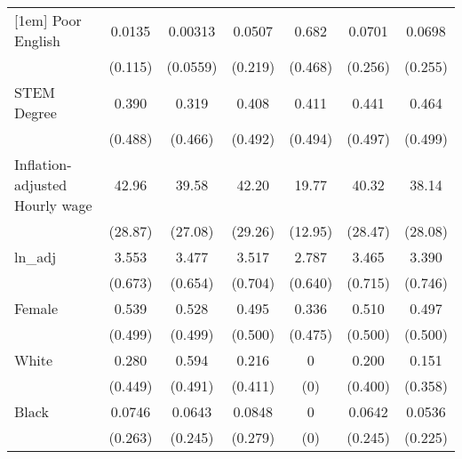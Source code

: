 \begin{table}[htbp]
\begin{tabular}{l*{6}{c}}
[1em]
Poor English        &      0.0135         &     0.00313         &      0.0507         &       0.682         &      0.0701         &      0.0698         \\
                    &     (0.115)         &    (0.0559)         &     (0.219)         &     (0.468)         &     (0.256)         &     (0.255)         \\
[1em]
STEM Degree         &       0.390         &       0.319         &       0.408         &       0.411         &       0.441         &       0.464         \\
                    &     (0.488)         &     (0.466)         &     (0.492)         &     (0.494)         &     (0.497)         &     (0.499)         \\
[1em]
Inflation-adjusted Hourly wage&       42.96         &       39.58         &       42.20         &       19.77         &       40.32         &       38.14         \\
                    &     (28.87)         &     (27.08)         &     (29.26)         &     (12.95)         &     (28.47)         &     (28.08)         \\
[1em]
ln\_adj              &       3.553         &       3.477         &       3.517         &       2.787         &       3.465         &       3.390         \\
                    &     (0.673)         &     (0.654)         &     (0.704)         &     (0.640)         &     (0.715)         &     (0.746)         \\
[1em]
Female              &       0.539         &       0.528         &       0.495         &       0.336         &       0.510         &       0.497         \\
                    &     (0.499)         &     (0.499)         &     (0.500)         &     (0.475)         &     (0.500)         &     (0.500)         \\
[1em]
White               &       0.280         &       0.594         &       0.216         &           0         &       0.200         &       0.151         \\
                    &     (0.449)         &     (0.491)         &     (0.411)         &         (0)         &     (0.400)         &     (0.358)         \\
[1em]
Black               &      0.0746         &      0.0643         &      0.0848         &           0         &      0.0642         &      0.0536         \\
                    &     (0.263)         &     (0.245)         &     (0.279)         &         (0)         &     (0.245)         &     (0.225)         \\

\end{tabular}
\end{table}
